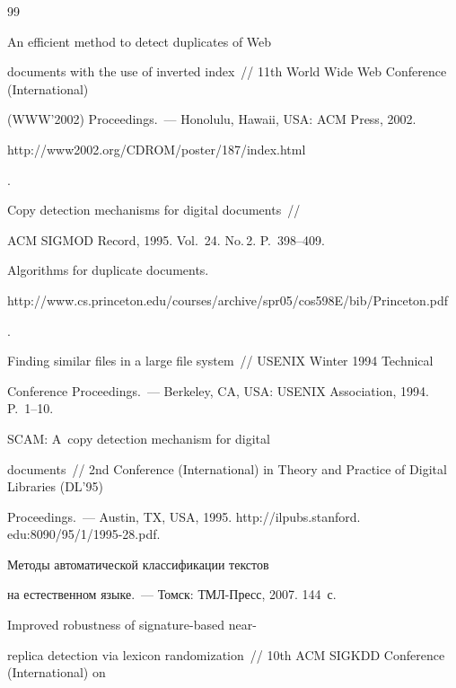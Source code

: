 {{\begin{thebibliography}{99}

 An efficient method to detect duplicates of Web

documents with the use of inverted index~/\!\!/ 11th World Wide Web Conference (International)

(WWW'2002) Proceedings.~--- Honolulu, Hawaii, USA: ACM Press, 2002. {\sf

http://www2002.org/CDROM/poster/187/index.html}.


 Copy detection mechanisms for digital documents~/\!\!/

ACM SIGMOD Record, 1995. Vol.~24. No.\,2. P.~398--409.


 Algorithms for duplicate documents. {\sf

http://www.cs.princeton.edu/\linebreak courses/archive/spr05/cos598E/bib/Princeton.pdf}.


 Finding similar files in a large file system~/\!\!/  USENIX Winter 1994 Technical

Conference Proceedings.~--- Berkeley, CA, USA: USENIX Association, 1994. P.~1--10.


 SCAM: A~copy detection mechanism for digital

documents~/\!\!/ 2nd Conference (International) in Theory and Practice of Digital Libraries (DL'95)

Proceedings.~--- Austin, TX, USA, 1995. {\sf http://ilpubs.stanford. edu:8090/95/1/1995-28.pdf}.


 Методы автоматической классификации текстов

на естественном языке.~--- Томск: ТМЛ-Пресс, 2007. 144~с.




 Improved robustness of signature-based near-

replica detection via lexicon randomization~/\!\!/ 10th ACM SIGKDD Conference (International) on


\end{thebibliography}}}
